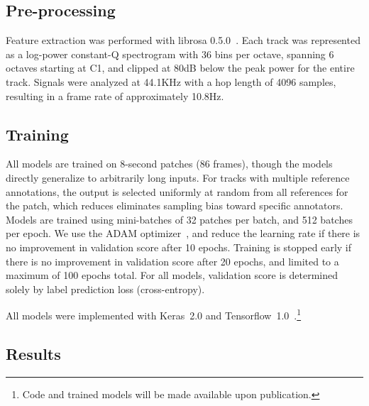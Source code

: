 \documentclass{article}
\begin{document}
\subsection{Pre-processing}

Feature extraction was performed with librosa 0.5.0~\cite{librosa050}.
Each track was represented as a log-power constant-Q spectrogram with 36 bins per octave, spanning 6 octaves starting at C1, and clipped at 80dB below the peak power for the entire track.
Signals were analyzed at 44.1KHz with a hop length of 4096 samples, resulting in a frame rate of approximately 10.8Hz.

\subsection{Training}
All models are trained on 8-second patches (86 frames), though the models directly generalize to arbitrarily long inputs.
For tracks with multiple reference annotations, the output is selected uniformly at random from all references for the patch, which reduces eliminates sampling bias toward specific annotators.
Models are trained using mini-batches of 32 patches per batch, and 512 batches per epoch.
We use the ADAM optimizer~\cite{kingma2014adam}, and reduce the learning rate if there is no improvement in validation score after 10 epochs.
Training is stopped early if there is no improvement in validation score after 20 epochs, and limited to a maximum of 100 epochs total.
For all models, validation score is determined solely by label prediction loss (cross-entropy).


All models were implemented with Keras~2.0 and Tensorflow~1.0~\cite{chollet2015keras, tensorflow2015-whitepaper}.\footnote{Code and trained models will be made available upon publication.}

\subsection{Results}
\end{document}
